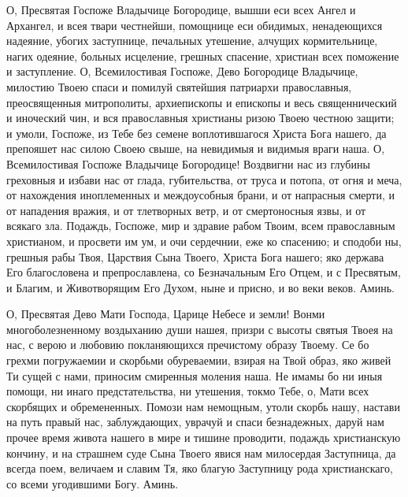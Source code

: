 \begin{mymulticols}
О, Пресвятая Госпоже Владычице Богородице, вышши еси всех Ангел и Архангел, и всея твари честнейши, помощнице еси обидимых, ненадеющихся надеяние, убогих заступнице, печальных утешение, алчущих кормительнице, нагих одеяние, больных исцеление, грешных спасение, христиан всех поможение и заступление. О, Всемилостивая Госпоже, Дево Богородице Владычице, милостию Твоею спаси и помилуй святейшия патриархи православныя, преосвященныя митрополиты, архиепископы и епископы и весь священнический и иноческий чин, и вся православныя христианы ризою Твоею честною защити; и умоли, Госпоже, из Тебе без семене воплотившагося Христа Бога нашего, да препояшет нас силою Своею свыше, на невидимыя и видимыя враги наша. О, Всемилостивая Госпоже Владычице Богородице! Воздвигни нас из глубины греховныя и избави нас от глада, губительства, от труса и потопа, от огня и меча, от нахождения иноплеменных и междоусобныя брани, и от напрасныя смерти, и от нападения вражия, и от тлетворных ветр, и от смертоносныя язвы, и от всякаго зла. Подаждь, Госпоже, мир и здравие рабом Твоим, всем православным христианом, и просвети им ум, и очи сердечнии, еже ко спасению; и сподоби ны, грешныя рабы Твоя, Царствия Сына Твоего, Христа Бога нашего; яко держава Его благословена и препрославлена, со Безначальным Его Отцем, и с Пресвятым, и Благим, и Животворящим Его Духом, ныне и присно, и во веки веков. Аминь.

О, Пресвятая Дево Мати Господа, Царице Небесе и земли! Вонми многоболезненному воздыханию души нашея, призри с высоты святыя Твоея на нас, с верою и любовию покланяющихся пречистому образу Твоему. Се бо грехми погружаемии и скорбьми обуреваемии, взирая на Твой образ, яко живей Ти сущей с нами, приносим смиренныя моления наша. Не имамы бо ни иныя помощи, ни инаго предстательства, ни утешения, токмо Тебе, о, Мати всех скорбящих и обремененных. Помози нам немощным, утоли скорбь нашу, настави на путь правый нас, заблуждающих, уврачуй и спаси безнадежных, даруй нам прочее время живота нашего в мире и тишине проводити, подаждь христианскую кончину, и на страшнем суде Сына Твоего явися нам милосердая Заступница, да всегда поем, величаем и славим Тя, яко благую Заступницу рода христианскаго, со всеми угодившими Богу. Аминь.


\end{mymulticols}

\mychapterending



